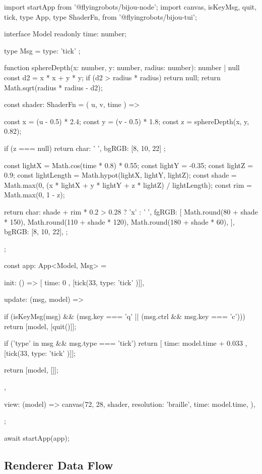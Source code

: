 \begin{CodeBlock}
import { startApp } from '@flyingrobots/bijou-node';
import {
  canvas,
  isKeyMsg,
  quit,
  tick,
  type App,
  type ShaderFn,
} from '@flyingrobots/bijou-tui';

interface Model {
  readonly time: number;
}

type Msg = { type: 'tick' };

function sphereDepth(x: number, y: number, radius: number): number | null {
  const d2 = x * x + y * y;
  if (d2 > radius * radius) return null;
  return Math.sqrt(radius * radius - d2);
}

const shader: ShaderFn = ({ u, v, time }) => {
  const x = (u - 0.5) * 2.4;
  const y = (v - 0.5) * 1.8;
  const z = sphereDepth(x, y, 0.82);

  if (z === null) {
    return { char: ' ', bgRGB: [8, 10, 22] };
  }

  const lightX = Math.cos(time * 0.8) * 0.55;
  const lightY = -0.35;
  const lightZ = 0.9;
  const lightLength = Math.hypot(lightX, lightY, lightZ);
  const shade = Math.max(0, (x * lightX + y * lightY + z * lightZ) / lightLength);
  const rim = Math.max(0, 1 - z);

  return {
    char: shade + rim * 0.2 > 0.28 ? 'x' : ' ',
    fgRGB: [
      Math.round(80 + shade * 150),
      Math.round(110 + shade * 120),
      Math.round(180 + shade * 60),
    ],
    bgRGB: [8, 10, 22],
  };
};

const app: App<Model, Msg> = {
  init: () => [{ time: 0 }, [tick(33, { type: 'tick' })]],

  update: (msg, model) => {
    if (isKeyMsg(msg) && (msg.key === 'q' || (msg.ctrl && msg.key === 'c'))) {
      return [model, [quit()]];
    }

    if ('type' in msg && msg.type === 'tick') {
      return [{ time: model.time + 0.033 }, [tick(33, { type: 'tick' })]];
    }

    return [model, []];
  },

  view: (model) =>
    canvas(72, 28, shader, {
      resolution: 'braille',
      time: model.time,
    }),
};

await startApp(app);
\end{CodeBlock}

\subsection{Renderer Data Flow}\label{record-015-renderer-data-flow}

